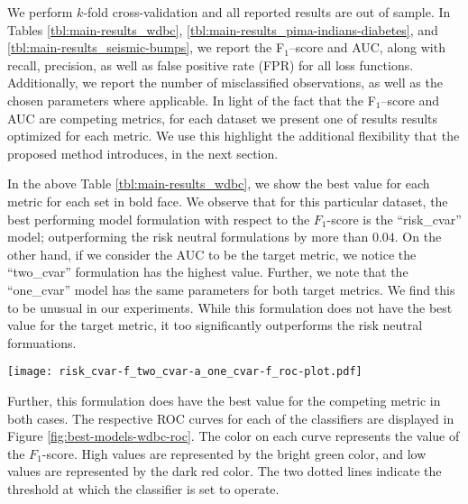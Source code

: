 \documentclass[10pt,letterpaper]{article}
\newcommand{\1}{1{\hskip -2.55 pt}\hbox{I}}
\begin{document}
We perform $k$-fold cross-validation and all reported results are out of sample.
In Tables \ref{tbl:main-results_wdbc}, \ref{tbl:main-results_pima-indians-diabetes}, and \ref{tbl:main-results_seismic-bumps}, we report the F$_1$--score  and AUC, along with recall, precision, as well as false positive rate (FPR) for all loss functions. 
Additionally, we report the number of misclassified observations, as well as the chosen parameters where applicable.
In light of the fact that the F$_1$--score and AUC are competing metrics, for each dataset we present one of results results optimized for each metric.
We use this highlight the additional flexibility that the proposed method introduces, in the next section.



In the above Table \ref{tbl:main-results_wdbc}, we show the best value for each metric for each set in bold face.
We observe that for this particular dataset, the best performing model formulation with respect to the $F_1$-score is the ``risk\_cvar'' model; outperforming the risk neutral formulations by more than $0.04$.
On the other hand, if we consider the AUC to be the target metric, we notice the ``two\_cvar'' formulation has the highest value.
Further, we note that the ``one\_cvar'' model has the same parameters for both target metrics.
We find this to be unusual in our experiments.
While this formulation does not have the best value for the target metric, it too significantly outperforms the risk neutral formuations.

\begin{figure*}[h!]
\begin{center}
\texttt{[image: risk\_cvar-f\_two\_cvar-a\_one\_cvar-f\_roc-plot.pdf]}
\caption{ROC plots for the best performing model formulations on the WDBC data: ``risk\_cvar'' with the best $F_1$-score, ``two\_cvar'' with the best AUC value, and ``one\_cvar'' for the alternate metric.}
\label{fig:best-models-wdbc-roc}
\end{center}
\end{figure*}

Further, this formulation does have the best value for the competing metric in both cases.
The respective ROC curves for each of the classifiers are displayed in Figure \ref{fig:best-models-wdbc-roc}.
The color on each curve represents the value of the $F_1$-score.
High values are represented by the bright green color, and low values are represented by the dark red color.
The two dotted lines indicate the threshold at which the classifier is set to operate.
\end{document}
